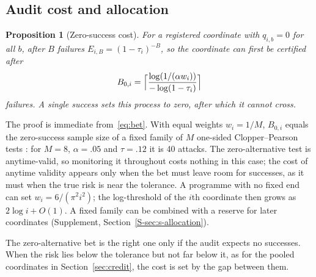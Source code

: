 \documentclass{jpc}
\newtheorem{proposition}[thm]{Proposition}
\theoremstyle{remark}
\begin{document}
\subsection{Audit cost and allocation}
\begin{proposition}[Zero-success cost]\label{prop:cost}
For a registered coordinate with $q_{i,b}=0$ for all $b$, after $B$ failures $E_{i,B}=(1-\tau_i)^{-B}$, so the coordinate can first be certified after
\begin{equation}\label{eq:budget}
B_{0,i}=\Bigl\lceil\frac{\log(1/(\alpha w_i))}{-\log(1-\tau_i)}\Bigr\rceil
\end{equation}
failures. A single success sets this process to zero, after which it cannot cross.
\end{proposition}
The proof is immediate from~\eqref{eq:bet}. With equal weights $w_i=1/M$, $B_{0,i}$ equals the zero-success sample size of a fixed family of $M$ one-sided Clopper--Pearson tests \cite{clopper1934}: for $M=8$, $\alpha=.05$ and $\tau=.12$ it is 40 attacks. The zero-alternative test is anytime-valid, so monitoring it throughout costs nothing in this case; the cost of anytime validity appears only when the bet must leave room for successes, as it must when the true risk is near the tolerance. A programme with no fixed end can set $w_i=6/(\pi^2i^2)$; the log-threshold of the $i$th coordinate then grows as $2\log i+O(1)$. A fixed family can be combined with a reserve for later coordinates (Supplement, Section~\ref{S-sec:s-allocation}).

The zero-alternative bet is the right one only if the audit expects no successes. When the risk lies below the tolerance but not far below it, as for the pooled coordinates in Section~\ref{sec:credit}, the cost is set by the gap between them.
\end{document}

